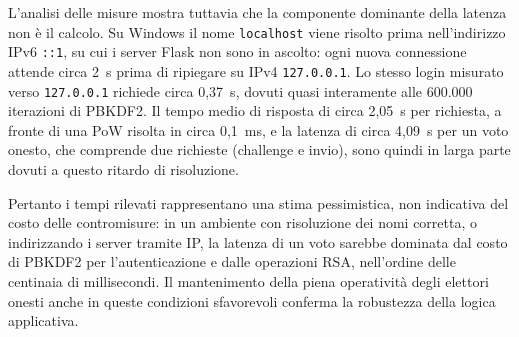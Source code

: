 \documentclass[12pt,a4paper]{article}
\begin{document}
L'analisi delle misure mostra tuttavia che la componente dominante della latenza non è il calcolo. Su Windows il nome \texttt{localhost} viene risolto prima nell'indirizzo IPv6 \texttt{::1}, su cui i server Flask non sono in ascolto: ogni nuova connessione attende circa 2~s prima di ripiegare su IPv4 \texttt{127.0.0.1}. Lo stesso login misurato verso \texttt{127.0.0.1} richiede circa 0,37~s, dovuti quasi interamente alle 600.000 iterazioni di PBKDF2. Il tempo medio di risposta di circa 2,05~s per richiesta, a fronte di una PoW risolta in circa 0,1~ms, e la latenza di circa 4,09~s per un voto onesto, che comprende due richieste (challenge e invio), sono quindi in larga parte dovuti a questo ritardo di risoluzione.

Pertanto i tempi rilevati rappresentano una stima pessimistica, non indicativa del costo delle contromisure: in un ambiente con risoluzione dei nomi corretta, o indirizzando i server tramite IP, la latenza di un voto sarebbe dominata dal costo di PBKDF2 per l'autenticazione e dalle operazioni RSA, nell'ordine delle centinaia di millisecondi. Il mantenimento della piena operatività degli elettori onesti anche in queste condizioni sfavorevoli conferma la robustezza della logica applicativa.
\end{document}
